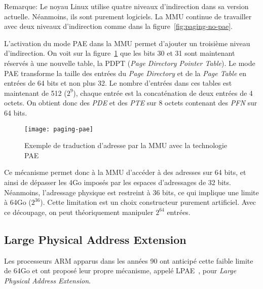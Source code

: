       \begin{paragraph}{Remarque:}
        Le noyau Linux utilise quatre niveaux d'indirection dans sa version
        actuelle. Néanmoins, ils sont purement logiciels. La MMU continue de
        travailler avec deux niveaux d'indirection comme dans la
        figure~\ref{fig:paging-no-pae}.\\
      \end{paragraph}
      
      L'activation du mode PAE dans la MMU permet d'ajouter un troisième niveau
      d'indirection. On voit sur la figure~\ref{fig:paging-pae} que les bits 30
      et 31 sont maintenant réservés à une nouvelle table, la
      PDPT (\textit{Page
        Directory Pointer Table}). Le mode PAE transforme la taille des entrées
      du \textit{Page Directory} et de la \textit{Page Table} en entrées de 64
      bits et non plus 32. Le nombre d'entrées dans ces tables est maintenant de
      512 ($2^{9}$), chaque entrée est la concaténation de deux entrées de 4
      octets. On obtient donc des \textit{PDE} et des \textit{PTE} sur 8 octets
      contenant des \textit{PFN} sur 64 bits.

      \begin{figure}[ht]
        \centering \texttt{[image: paging-pae]}
        \caption{Exemple de traduction d'adresse par la MMU avec la technologie
          PAE}
        \label{fig:paging-pae}
      \end{figure}
      
      Ce mécanisme permet donc à la MMU d'accéder à des adresses sur 64 bits, et
      ainsi de dépasser les 4Go imposés par les espaces d'adressages de 32
      bits. Néanmoins, l'adressage physique est restreint à 36 bits, ce qui
      implique une limite à 64Go ($2^{36}$). Cette limitation est un choix
      constructeur purement artificiel. Avec ce découpage, on peut théoriquement
      manipuler $2^{64}$ entrées.


    \subsection{Large Physical Address Extension}

    Les processeurs ARM apparus dans les années 90 ont anticipé cette faible
    limite de 64Go et ont proposé leur propre mécanisme, appelé
    LPAE~\citep{arm2012principles,marinas2011linux}, pour \textit{Large Physical Address
      Extension}.

